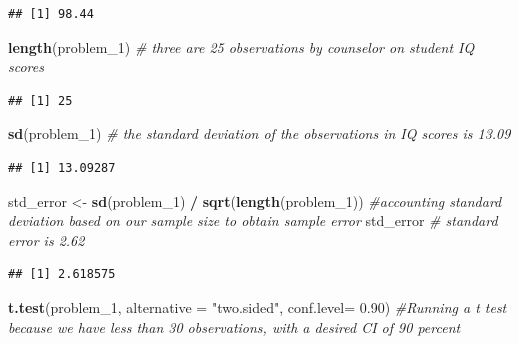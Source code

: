 \documentclass[]{article}
\newenvironment{Shaded}{\begin{snugshade}}{\end{snugshade}}
\newcommand{\CommentTok}[1]{\textcolor[rgb]{0.56,0.35,0.01}{\textit{#1}}}
\newcommand{\DataTypeTok}[1]{\textcolor[rgb]{0.13,0.29,0.53}{#1}}
\newcommand{\DecValTok}[1]{\textcolor[rgb]{0.00,0.00,0.81}{#1}}
\newcommand{\FloatTok}[1]{\textcolor[rgb]{0.00,0.00,0.81}{#1}}
\newcommand{\KeywordTok}[1]{\textcolor[rgb]{0.13,0.29,0.53}{\textbf{#1}}}
\newcommand{\NormalTok}[1]{#1}
\newcommand{\OperatorTok}[1]{\textcolor[rgb]{0.81,0.36,0.00}{\textbf{#1}}}
\newcommand{\StringTok}[1]{\textcolor[rgb]{0.31,0.60,0.02}{#1}}
\begin{document}
\begin{verbatim}
## [1] 98.44
\end{verbatim}

\begin{Shaded}
\begin{Highlighting}[]
\KeywordTok{length}\NormalTok{(problem_}\DecValTok{1}\NormalTok{) }\CommentTok{# three are 25 observations by counselor on student IQ scores}
\end{Highlighting}
\end{Shaded}

\begin{verbatim}
## [1] 25
\end{verbatim}

\begin{Shaded}
\begin{Highlighting}[]
\KeywordTok{sd}\NormalTok{(problem_}\DecValTok{1}\NormalTok{) }\CommentTok{# the standard deviation of the observations in IQ scores is 13.09}
\end{Highlighting}
\end{Shaded}

\begin{verbatim}
## [1] 13.09287
\end{verbatim}

\begin{Shaded}
\begin{Highlighting}[]
\NormalTok{std_error <-}\StringTok{ }\KeywordTok{sd}\NormalTok{(problem_}\DecValTok{1}\NormalTok{) }\OperatorTok{/}\StringTok{ }\KeywordTok{sqrt}\NormalTok{(}\KeywordTok{length}\NormalTok{(problem_}\DecValTok{1}\NormalTok{)) }\CommentTok{#accounting standard deviation based on our sample size to obtain sample error}
\NormalTok{std_error }\CommentTok{# standard error is 2.62}
\end{Highlighting}
\end{Shaded}

\begin{verbatim}
## [1] 2.618575
\end{verbatim}

\begin{Shaded}
\begin{Highlighting}[]
\KeywordTok{t.test}\NormalTok{(problem_}\DecValTok{1}\NormalTok{, }\DataTypeTok{alternative =} \StringTok{"two.sided"}\NormalTok{, }\DataTypeTok{conf.level=} \FloatTok{0.90}\NormalTok{) }\CommentTok{#Running a t test because we have less than 30 observations, with a desired CI of 90 percent}
\end{Highlighting}
\end{Shaded}
\end{document}
